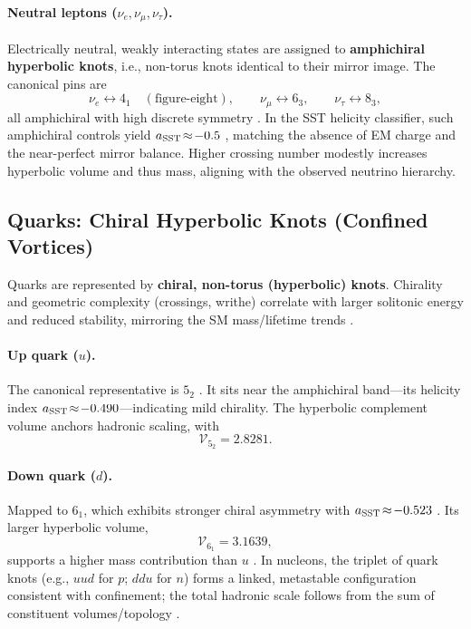 \documentclass[11pt]{article}
\begin{document}
        \paragraph{Neutral leptons ($\nu_e,\nu_\mu,\nu_\tau$).}
            Electrically neutral, weakly interacting states are assigned to \textbf{amphichiral hyperbolic knots}, i.e., non-torus knots identical to their mirror image. The canonical pins are
            \[
                \nu_e \leftrightarrow 4_1\quad(\text{figure-eight}),\qquad
                \nu_\mu \leftrightarrow 6_3,\qquad
                \nu_\tau \leftrightarrow 8_3,
            \]
            all amphichiral with high discrete symmetry \cite{KnotAtlas}. In the SST helicity classifier, such amphichiral controls yield $a_{\rm SST}\!\approx\!-0.5$ \cite{Iskandarani2025Helicity}, matching the absence of EM charge and the near-perfect mirror balance. Higher crossing number modestly increases hyperbolic volume and thus mass, aligning with the observed neutrino hierarchy.

\subsection{Quarks: Chiral Hyperbolic Knots (Confined Vortices)}

    Quarks are represented by \textbf{chiral, non-torus (hyperbolic) knots}. Chirality and geometric complexity (crossings, writhe) correlate with larger solitonic energy and reduced stability, mirroring the SM mass/lifetime trends \cite{Iskandarani2025Helicity}.

    \paragraph{Up quark ($u$).}
        The canonical representative is $5_2$ \cite{Iskandarani2025Helicity}. It sits near the amphichiral band—its helicity index $a_{\rm SST}\!\approx\!-0.490$—indicating mild chirality. The hyperbolic complement volume anchors hadronic scaling, with
        \[
            \mathcal{V}_{5_2}=2.8281.
        \]

    \paragraph{Down quark ($d$).}
        Mapped to $6_1$, which exhibits stronger chiral asymmetry with $a_{\rm SST}\!\approx\!-0.523$ \cite{Iskandarani2025Helicity}. Its larger hyperbolic volume,
        \[
            \mathcal{V}_{6_1}=3.1639,
        \]
        supports a higher mass contribution than $u$ \cite{Iskandarani2025Mass}. In nucleons, the triplet of quark knots (e.g., $u\!u\!d$ for $p$; $d\!d\!u$ for $n$) forms a linked, metastable configuration consistent with confinement; the total hadronic scale follows from the sum of constituent volumes/topology \cite{Iskandarani2025Mass}.
\end{document}
